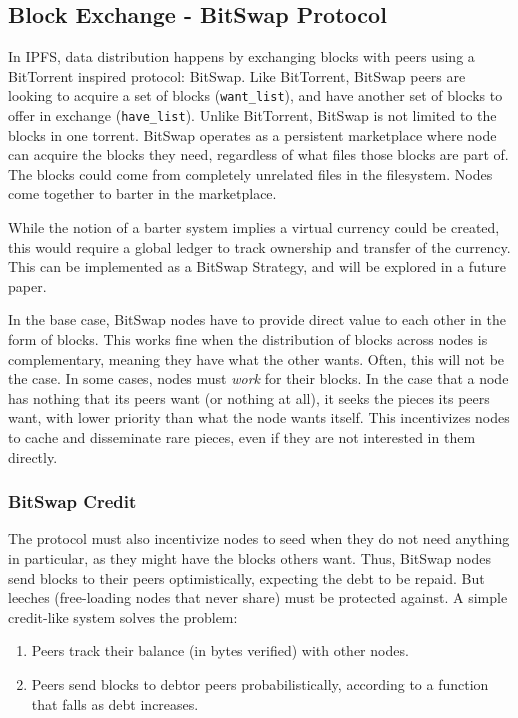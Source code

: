 \documentclass{sig-alternate}
\begin{document}
\subsection{Block Exchange - BitSwap Protocol}

In IPFS, data distribution happens by exchanging blocks with peers using a
BitTorrent inspired protocol: BitSwap. Like BitTorrent, BitSwap peers are
looking to acquire a set of blocks (\texttt{want\_list}), and have another set
of blocks to offer in exchange (\texttt{have\_list}).
Unlike BitTorrent, BitSwap is not limited to the blocks in one torrent.
BitSwap operates as a persistent marketplace where node can acquire the
blocks they need, regardless of what files those blocks are part of. The
blocks could come from completely unrelated files in the filesystem.
Nodes come together to barter in the marketplace.

While the notion of a barter system implies a virtual currency could be
created, this would require a global ledger to track ownership
and transfer of the currency. This can be implemented as a BitSwap Strategy, and will be explored in a future paper.

In the base case, BitSwap nodes have to provide direct value to each other
in the form of blocks. This works fine when the distribution of blocks across
nodes is complementary, meaning they have what the other wants. Often, this
will not be the case. In some cases, nodes must \textit{work} for their
blocks. In the case that a node has nothing that its peers want (or
nothing at all), it seeks the pieces its peers want, with lower
priority than what the node wants itself. This incentivizes nodes to cache and
disseminate rare pieces, even if they are not interested in them directly.

\subsubsection{BitSwap Credit}

The protocol must also incentivize nodes to seed when they do not need
anything in particular, as they might have the blocks others want. Thus,
BitSwap nodes send blocks to their peers optimistically, expecting the debt to
be repaid. But leeches (free-loading nodes that never share) must be protected against. A simple credit-like system solves the problem:

\begin{enumerate}
  \item Peers track their balance (in bytes verified) with other nodes.
  \item Peers send blocks to debtor peers probabilistically, according to
        a function that falls as debt increases.
\end{enumerate}
\end{document}
